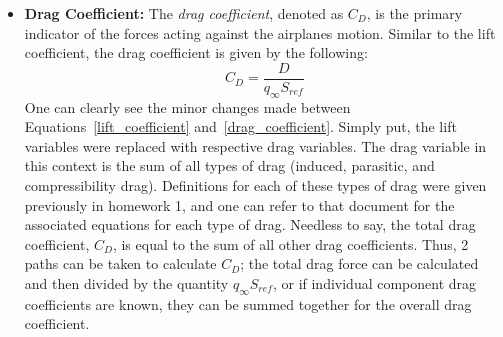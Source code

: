 \documentclass{report}
\begin{document}
\begin{itemize}
\begin{itemize}
        One might wonder why a normalization factor is necessary when we really care about the lifting forces on the wing. The power in normalization is that it allows the engineer to compare the lift of a variety of wing shapes and sizes (with varying angle of attack, sweep, twist, dihedral, etc.). In the normalization formula, we divide the lifting force by the dynamic pressure (which would be the same for any wing traveling at the same speed through the same fluid).
        Then we divide by the wing reference area. This is important as it normalizes the absolute magnitude of lift across wing sizes. It's obvious to see how the lift generated by a large airliner and a small propeller plane are vastly different.
        Because of this, we factor out the wing area to compare the true efficiencies of wings of any size.
        \item[] \textbf{Drag Coefficient:} The \textit{drag coefficient}, denoted as $C_D$, is the primary indicator of the forces acting against the airplanes motion.
        Similar to the lift coefficient, the drag coefficient is given by the following:
        \begin{equation}
            C_D = \frac{D}{q_{\infty} S_{ref}}\label{drag_coefficient}
        \end{equation}
        One can clearly see the minor changes made between Equations~\eqref{lift_coefficient} and~\eqref{drag_coefficient}. Simply put, the lift variables were replaced with respective drag variables.
        The drag variable in this context is the sum of all types of drag (induced, parasitic, and compressibility drag). Definitions for each of these types of drag were given previously in homework 1, and one can refer to that document for the associated equations for each type of drag.
        Needless to say, the total drag coefficient, $C_D$, is equal to the sum of all other drag coefficients. Thus, 2 paths can be taken to calculate $C_D$; the total drag force can be calculated and then divided by the quantity $q_{\infty} S_{ref}$, or if individual component drag coefficients are known, they can be summed together for the overall drag coefficient.
        

\end{itemize}
\end{itemize}
\end{document}
